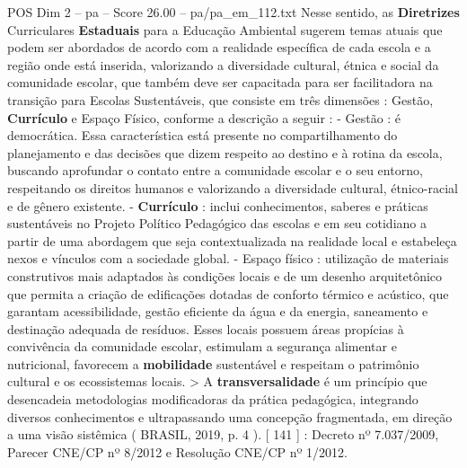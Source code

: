 \begin{textsample}{POS Dim 2 – pa – Score 26.00 – pa/pa\_em\_112.txt}
Nesse sentido, as \textbf{Diretrizes} Curriculares \textbf{Estaduais} para a Educação Ambiental sugerem temas atuais que podem ser abordados de acordo com a realidade específica de cada escola e a região onde está inserida, valorizando a diversidade cultural, étnica e social da comunidade escolar, que também deve ser capacitada para ser facilitadora na transição para Escolas Sustentáveis, que consiste em três dimensões : Gestão, \textbf{Currículo} e Espaço Físico, conforme a descrição a seguir : - Gestão : é democrática.
Essa característica está presente no compartilhamento do planejamento e das decisões que dizem respeito ao destino e à rotina da escola, buscando aprofundar o contato entre a comunidade escolar e o seu entorno, respeitando os direitos humanos e valorizando a diversidade cultural, étnico-racial e de gênero existente. - \textbf{Currículo} : inclui conhecimentos, saberes e práticas sustentáveis no Projeto Político Pedagógico das escolas e em seu cotidiano a partir de uma abordagem que seja contextualizada na realidade local e estabeleça nexos e vínculos com a sociedade global. - Espaço físico : utilização de materiais construtivos mais adaptados às condições locais e de um desenho arquitetônico que permita a criação de edificações dotadas de conforto térmico e acústico, que garantam acessibilidade, gestão eficiente da água e da energia, saneamento e destinação adequada de resíduos.
Esses locais possuem áreas propícias à convivência da comunidade escolar, estimulam a segurança alimentar e nutricional, favorecem a \textbf{mobilidade} sustentável e respeitam o patrimônio cultural e os ecossistemas locais. > A \textbf{transversalidade} é um princípio que desencadeia metodologias modificadoras da prática pedagógica, integrando diversos conhecimentos e ultrapassando uma concepção fragmentada, em direção a uma visão sistêmica ( BRASIL, 2019, p. 4 ). [ 141 ] : Decreto nº 7.037/2009, Parecer CNE/CP nº 8/2012 e Resolução CNE/CP nº 1/2012.

\end{textsample}
